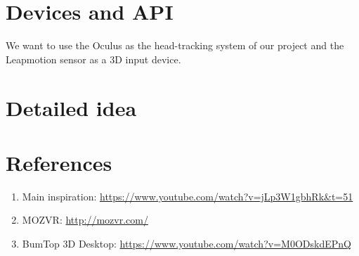 \documentclass[paper=a4, fontsize=11pt]{scrartcl} %
\numberwithin{equation}{section} %
\numberwithin{figure}{section} %
\numberwithin{table}{section} %
\begin{document}

\section{Devices and API}
We want to use the Oculus as the head-tracking system of our project and the Leapmotion sensor as a 3D input device. 


\section{Detailed idea}



\section{References}
\label{sec:refs}
\begin{enumerate}
\item Main inspiration: \url{https://www.youtube.com/watch?v=jLp3W1gbhRk&t=51}
\item MOZVR: \url{http://mozvr.com/}
\item BumTop 3D Desktop: \url{https://www.youtube.com/watch?v=M0ODskdEPnQ}
\end{enumerate}
\end{document}
